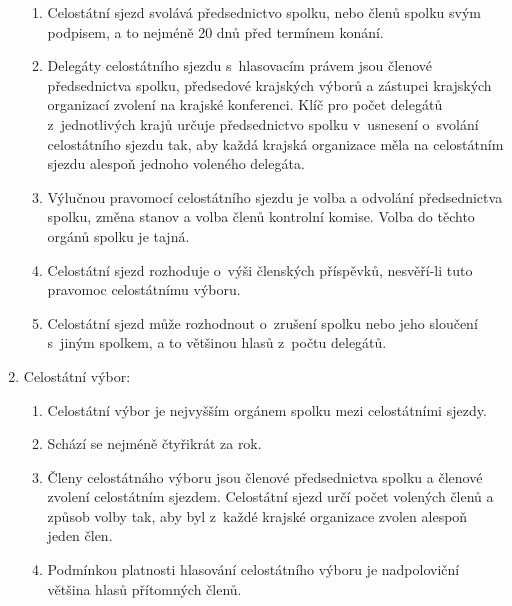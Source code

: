 \documentclass[a4paper]{article}
\begin{document}
\begin{enumerate}
\begin{enumerate}
        \item Celostátní sjezd svolává předsednictvo spolku, nebo
             členů spolku svým podpisem, a to nejméně 20 dnů
            před termínem konání.

        \item Delegáty celostátního sjezdu s~hlasovacím právem jsou členové
            předsednictva spolku, předsedové krajských výborů a zástupci
            krajských organizací zvolení na krajské konferenci. Klíč pro počet
            delegátů z~jednotlivých krajů určuje předsednictvo spolku
            v~usnesení o~svolání celostátního sjezdu tak, aby každá krajská
            organizace měla na celostátním sjezdu alespoň jednoho voleného
            delegáta.

        \item Výlučnou pravomocí celostátního sjezdu je volba a odvolání
            předsednictva spolku, změna stanov a volba členů
            kontrolní komise. Volba do těchto orgánů spolku je tajná.

        \item Celostátní sjezd rozhoduje o~výši členských příspěvků,
            nesvěří-li tuto pravomoc celostátnímu výboru.

        \item Celostátní sjezd může rozhodnout o~zrušení spolku nebo jeho
            sloučení s~jiným spolkem, a to  většinou hlasů
            z~počtu delegátů.
        \end{enumerate}

    \item Celostátní výbor:
        \begin{enumerate}
        \item Celostátní výbor je nejvyšším orgánem spolku mezi 
            celostátními sjezdy.

        \item Schází se nejméně čtyřikrát za rok.

        \item Členy celostátnáho výboru jsou členové předsednictva
            spolku a členové zvolení celostátním sjezdem.
            Celostátní sjezd určí počet volených členů a způsob volby
            tak, aby byl z~každé krajské organizace zvolen alespoň
            jeden člen.

        \item Podmínkou platnosti hlasování celostátního výboru
            je nadpoloviční většina hlasů přítomných členů.


\end{enumerate}
\end{enumerate}
\end{document}
